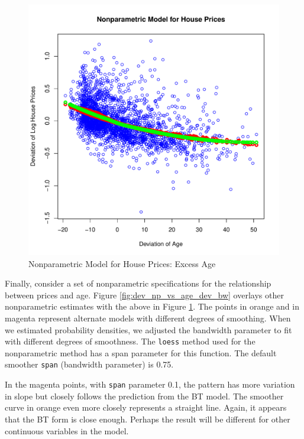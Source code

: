\begin{figure}[h!]
  \centering
  \includegraphics[scale = 0.5, keepaspectratio=true]{../Figures/dev_np_vs_age_dev}
  \caption{Nonparametric Model for House Prices: Excess Age} \label{fig:dev_np_vs_age_dev}
\end{figure}

 

\clearpage
Finally, consider a set of nonparametric specifications for 
the relationship between prices and age.
Figure \ref{fig:dev_np_vs_age_dev_bw} 
overlays other nonparametric estimates with the above in 
Figure \ref{fig:dev_np_vs_age_dev}.
The points in orange and in magenta represent
alternate models with different degrees of smoothing. 
%
When we estimated probability densities,
we adjusted the bandwidth parameter to fit
with different degrees of smoothness.
The \texttt{loess} method used for the nonparametric method has a span parameter for this function.
The default smoother \texttt{span} (bandwidth parameter) is 0.75.

In the magenta points, with \texttt{span} parameter 0.1, the pattern has more variation in slope but 
closely follows the prediction from the BT model. 
The smoother curve in orange 
even more closely represents a straight line. 
Again, it appears that the BT form
is close enough.
Perhaps the result will be different for other continuous variables in the model.

